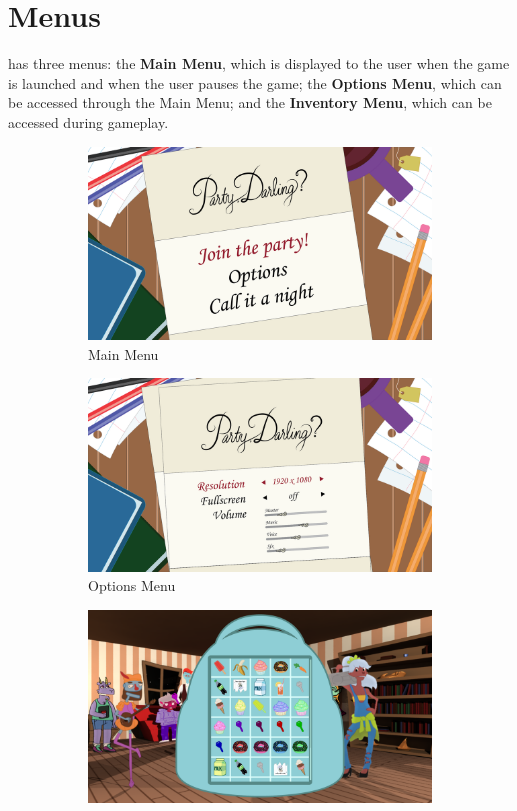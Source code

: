 \section{Menus}
\ourgame{} has three menus: the \textbf{Main Menu}, which is displayed to the user when the game is launched and when the user pauses the game; the \textbf{Options Menu}, which can be accessed through the Main Menu; and the \textbf{Inventory Menu}, which can be accessed during gameplay. 

\begin{figure}[htb]
  \centering\begin{subfigure}{.33\textwidth}
    \centering
    \includegraphics[width=.9\linewidth]{images/menu_main}
    \caption{Main Menu}
    \label{fig:menu_main}
  \end{subfigure}
  \begin{subfigure}{.33\textwidth}
    \centering
    \includegraphics[width=.9\linewidth]{images/menu_options}
    \caption{Options Menu}
    \label{fig:menu_options}
  \end{subfigure}
  \begin{subfigure}{.33\textwidth}
    \centering
    \includegraphics[width=.9\linewidth]{images/grid1}

\end{subfigure}
\end{figure}
